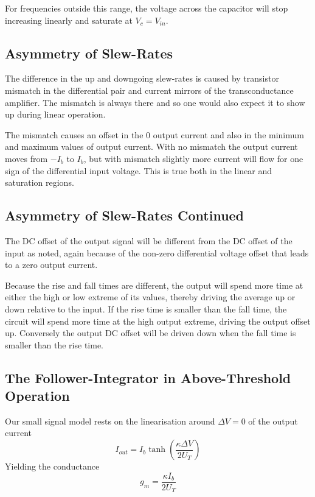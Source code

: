 For frequencies outside this range, the voltage across the capacitor will stop increasing linearly and saturate at \(V_c = V_{in}\).

\subsection{Asymmetry of Slew-Rates}
The difference in the up and downgoing slew-rates is caused by transistor mismatch in the differential pair and current mirrors of the 
transconductance amplifier. The mismatch is always there and so one would also expect it to show up during linear operation.

The mismatch causes an offset in the 0 output current and also in the minimum and maximum values of output current. With no mismatch
the output current moves from \(-I_b\) to \(I_b\), but with mismatch slightly more current will flow for one sign of the differential 
input voltage. This is true both in the linear and saturation regions.

\subsection{Asymmetry of Slew-Rates Continued}
The DC offset of the output signal will be different from the DC offset of the input as noted, again because of the non-zero differential voltage
offset that leads to a zero output current. 

Because the rise and fall times are different, the output will spend more time at either the high or low extreme of its values, thereby driving
the average up or down relative to the input. If the rise time is smaller than the fall time, the circuit will spend more time at the high
output extreme, driving the output offset up. Conversely the output DC offset will be driven down when the fall time is smaller than the 
rise time.

\subsection{The Follower-Integrator in Above-Threshold Operation}
Our small signal model rests on the linearisation around \(\Delta V = 0\) of the output current
\begin{equation*}
    I_{out} = I_b\tanh\left(\frac{\kappa\Delta V}{2U_T}\right)
\end{equation*}
Yielding the conductance 
\begin{equation*}
    g_m = \frac{\kappa I_b}{2U_T}
\end{equation*}

